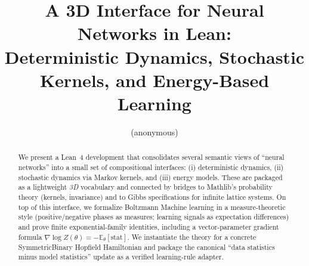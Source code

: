 \documentclass[11pt]{article}
\title{A 3D Interface for Neural Networks in Lean:\\
Deterministic Dynamics, Stochastic Kernels, and Energy-Based Learning}
\author{(anonymous)}
\date{}
\begin{document}
\maketitle

\begin{abstract}
We present a Lean~4 development that consolidates several semantic views of ``neural networks''
into a small set of compositional interfaces:
(i) deterministic dynamics, (ii) stochastic dynamics via Markov kernels, and (iii) energy models.
These are packaged as a lightweight \emph{3D} vocabulary and connected by bridges to Mathlib's
probability theory (kernels, invariance) and to Gibbs specifications for infinite lattice systems.
On top of this interface, we formalize Boltzmann Machine learning in a measure-theoretic style
(positive/negative phases as measures; learning signals as expectation differences) and prove
finite exponential-family identities, including a vector-parameter gradient formula
\(\nabla \log Z(\theta) = -\mathbb{E}_{\theta}[\mathrm{stat}]\).
We instantiate the theory for a concrete SymmetricBinary Hopfield Hamiltonian and package the
canonical ``data statistics minus model statistics'' update as a verified learning-rule adapter.
\end{abstract}
\end{document}
